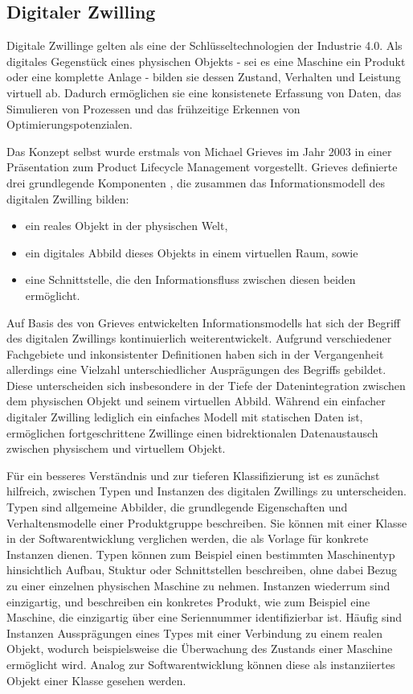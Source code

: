 \newpage
\subsection{Digitaler Zwilling}
Digitale Zwillinge gelten als eine der Schlüsseltechnologien der Industrie 4.0.
Als digitales Gegenstück eines physischen Objekts - sei es eine Maschine ein Produkt oder eine komplette Anlage - bilden sie dessen Zustand, Verhalten und Leistung virtuell ab.
Dadurch ermöglichen sie eine konsistenete Erfassung von Daten, das Simulieren von Prozessen und das frühzeitige Erkennen von Optimierungspotenzialen.

Das Konzept selbst wurde erstmals von Michael Grieves im Jahr 2003 in einer Präsentation zum Product Lifecycle Management vorgestellt. 
Grieves definierte drei grundlegende Komponenten \cite{DTGrieves} , die zusammen das Informationsmodell des digitalen Zwilling bilden:
\begin{itemize}
    \item ein reales Objekt in der physischen Welt,
    \item ein digitales Abbild dieses Objekts in einem virtuellen Raum, sowie
    \item eine Schnittstelle, die den Informationsfluss zwischen diesen beiden ermöglicht.
\end{itemize}

Auf Basis des von Grieves entwickelten Informationsmodells hat sich der Begriff des digitalen Zwillings kontinuierlich weiterentwickelt.
Aufgrund verschiedener Fachgebiete und inkonsistenter Definitionen haben sich in der Vergangenheit allerdings eine Vielzahl unterschiedlicher Ausprägungen des Begriffs gebildet.
Diese unterscheiden sich insbesondere in der Tiefe der Datenintegration zwischen dem physischen Objekt und seinem virtuellen Abbild.
Während ein einfacher digitaler Zwilling lediglich ein einfaches Modell mit statischen Daten ist, ermöglichen fortgeschrittene Zwillinge einen bidrektionalen Datenaustausch zwischen physischem und virtuellem Objekt. 

Für ein besseres Verständnis und zur tieferen Klassifizierung ist es zunächst hilfreich, zwischen Typen und Instanzen des digitalen Zwillings zu unterscheiden.
Typen sind allgemeine Abbilder, die grundlegende Eigenschaften und Verhaltensmodelle einer Produktgruppe beschreiben. 
Sie können mit einer Klasse in der Softwarentwicklung verglichen werden, die als Vorlage für konkrete Instanzen dienen.
Typen können zum Beispiel einen bestimmten Maschinentyp hinsichtlich Aufbau, Stuktur oder Schnittstellen beschreiben, ohne dabei Bezug zu einer einzelnen physischen Maschine zu nehmen.
Instanzen wiederrum sind einzigartig, und beschreiben ein konkretes Produkt, wie zum Beispiel eine Maschine, die einzigartig über eine Seriennummer identifizierbar ist.
Häufig sind Instanzen Aussprägungen eines Types mit einer Verbindung zu einem realen Objekt, wodurch beispielsweise die Überwachung des Zustands einer Maschine ermöglicht wird.
Analog zur Softwarentwicklung können diese als instanziiertes Objekt einer Klasse gesehen werden. \cite{ZEISS}

